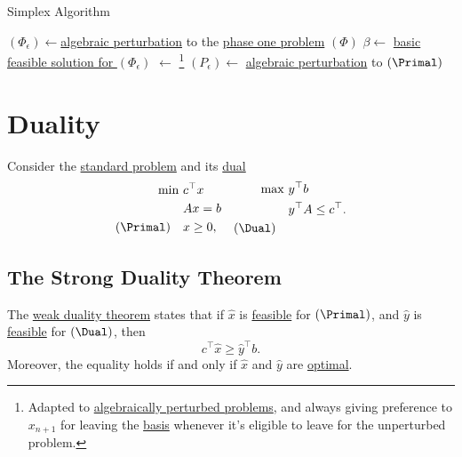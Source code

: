 \begin{algorithm}[H]\label{algo:simplex-algorithm}
	\DontPrintSemicolon
	\caption{Simplex Algorithm}
	\BlankLine

	\((\Phi_{\epsilon})\gets\)\hyperref[def:perturbed-problem]{algebraic perturbation} to the \hyperref[def:phase-one-problem]{phase one problem} \((\Phi)\)\;
	\(\beta \gets \) \hyperref[prob:phase-one-problem]{basic feasible solution for \((\Phi_{\epsilon })\)}\;
	\result \(\gets\) \WFSimplex{\((\Phi _\epsilon )\), \(\beta\)}\footnote{Adapted to \hyperref[def:perturbed-problem]{algebraically perturbed problems}, and always giving preference to \(x_{n+1}\) for leaving the \hyperref[def:basis]{basis} whenever it's eligible to leave for the unperturbed problem.}\;
	\;
	\((P_{\epsilon} )\gets\) \hyperref[def:perturbed-problem]{algebraic perturbation} to \((\Primal)\)\;
\end{algorithm}

\chapter{Duality}
Consider the \hyperref[def:standard-form]{standard problem} and its \hyperref[def:dual]{dual}
\[
	\begin{aligned}
		\min~          & c^{\top}x \\
		               & Ax = b    \\
		(\Primal)\quad & x\geq  0,
	\end{aligned}\quad \begin{aligned}
		\max ~       & y^{\top}b               \\
		             & y^{\top}A\leq c^{\top}. \\
		(\Dual)\quad &
	\end{aligned}
\]

\section{The Strong Duality Theorem}
\begin{prev}
	The \hyperref[thm:weak-duality]{weak duality theorem} states that if \(\hat{x}\) is \hyperref[def:feasible-solution]{feasible} for \((\Primal)\), and \(\hat{y}\) is \hyperref[def:feasible-solution]{feasible} for \((\Dual)\), then
	\[
		c^{\top} \hat{x} \geq  \hat{y}^{\top} b.
	\]
	Moreover, the equality holds if and only if \(\hat{x}\) and \(\hat{y}\) are \hyperref[def:optimal-solution]{optimal}.
\end{prev}

